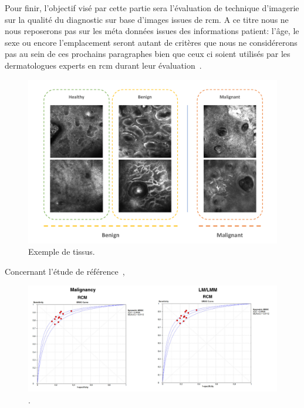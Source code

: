 Pour finir, l'objectif visé par cette partie sera l'évaluation de technique d'imagerie sur la qualité du diagnostic sur base d'images issues de \gls{rcm}. A ce titre nous ne nous reposerons pas sur les méta données issues des informations patient: l'âge, le sexe ou encore l'emplacement seront autant de critères que nous ne considérerons pas au sein de ces prochains paragraphes bien que ceux ci soient utilisés par les dermatologues experts en \gls{rcm} durant leur évaluation~\cite{Cinotti2018}.\par

\begin{figure}[H]
    \begin{center}
        \includegraphics[width=\linewidth]{contents/x_microscopy/resources/example_rcm_data.pdf}
        \caption{Exemple de tissus.}
        \label{fig:example_rcm_data}
    \end{center} 
\end{figure}\par


Concernant l'étude de référence~\cite{Cinotti2018}, 
\begin{figure}[H]
    \begin{center}
        \includegraphics[width=\linewidth]{contents/x_preamble_microscopy/resources/results_rcm_experts.png}
        \caption{.}
        \label{fig:results_rcm_experts}
    \end{center} 
\end{figure}\par


